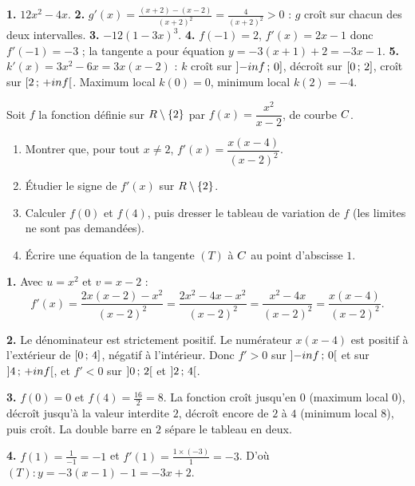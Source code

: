 \begin{corrige}[je me teste]
\textbf{1.} $12x^{2}-4x$.
\textbf{2.} $g'(x) = \frac{(x+2)-(x-2)}{(x+2)^{2}} = \frac{4}{(x+2)^{2}}
> 0$ : $g$ croît sur chacun des deux intervalles.
\textbf{3.} $-12(1-3x)^{3}$.
\textbf{4.} $f(-1) = 2$, $f'(x) = 2x-1$ donc $f'(-1) = -3$ ; la tangente a
pour équation $y = -3(x+1)+2 = -3x-1$.
\textbf{5.} $k'(x) = 3x^{2}-6x = 3x(x-2)$ : $k$ croît sur
$\left]-inf\,;\,0\right]$, décroît sur $\left[0\,;\,2\right]$, croît sur
$\left[2\,;\,+inf\right[$. Maximum local $k(0) = 0$, minimum local
$k(2) = -4$.
\end{corrige}

\begin{commeaubac}
Soit $f$ la fonction définie sur $R\setminus\{2\}$ par
$f(x) = \dfrac{x^{2}}{x-2}$, de courbe $C$.

\begin{enumerate}[label=\textbf{\arabic*.}, leftmargin=*, itemsep=0.25em]
  \item Montrer que, pour tout $x \neq 2$,
        $f'(x) = \dfrac{x(x-4)}{(x-2)^{2}}$. 
  \item Étudier le signe de $f'(x)$ sur $R\setminus\{2\}$. \bareme{1 pt}
  \item Calculer $f(0)$ et $f(4)$, puis dresser le tableau de variation de
        $f$ (les limites ne sont pas demandées). 
  \item Écrire une équation de la tangente $(T)$ à $C$ au point d'abscisse
        $1$. \bareme{1 pt}
\end{enumerate}
\end{commeaubac}

\begin{corrige}
\textbf{1.} Avec $u = x^{2}$ et $v = x-2$ :
\[
  f'(x) = \frac{2x(x-2)-x^{2}}{(x-2)^{2}}
  = \frac{2x^{2}-4x-x^{2}}{(x-2)^{2}} = \frac{x^{2}-4x}{(x-2)^{2}}
  = \frac{x(x-4)}{(x-2)^{2}} .
\]

\textbf{2.} Le dénominateur est strictement positif. Le numérateur $x(x-4)$
est positif à l'extérieur de $\left[0\,;\,4\right]$, négatif à l'intérieur.
Donc $f' > 0$ sur $\left]-inf\,;\,0\right[$ et sur
$\left]4\,;\,+inf\right[$, et $f' < 0$ sur $\left]0\,;\,2\right[$ et
$\left]2\,;\,4\right[$.

\textbf{3.} $f(0) = 0$ et $f(4) = \frac{16}{2} = 8$. La fonction croît
jusqu'en $0$ (maximum local $0$), décroît jusqu'à la valeur interdite $2$,
décroît encore de $2$ à $4$ (minimum local $8$), puis croît. La double barre
en $2$ sépare le tableau en deux.

\textbf{4.} $f(1) = \frac{1}{-1} = -1$ et
$f'(1) = \frac{1\times(-3)}{1} = -3$. D'où
$(T) : y = -3(x-1)-1 = -3x+2$.
\end{corrige}

